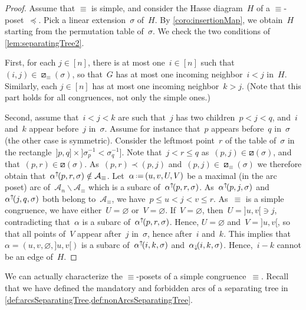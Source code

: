 \documentclass{amsart}
\theoremstyle{definition}
\newcommand{\ssm}{\smallsetminus} %
\newcommand{\eqdef}{\mbox{\,\raisebox{0.2ex}{\scriptsize\ensuremath{\mathrm:}}\ensuremath{=}\,}} %
\newcommand{\arcs}{{\mathcal{A}}} %
\newcommand{\arcDown}{\smash{\alpha_{\downarrow\!}}} %
\newcommand{\arcUp}{\smash{\alpha^{\uparrow\!}}} %
\begin{document}
\begin{proof}
Assume that $\equiv$ is simple, and consider the Hasse diagram~$H$ of a $\equiv$-poset~$\preccurlyeq$.
Pick a linear extension~$\sigma$ of~$H$.
By \cref{coro:insertionMap}, we obtain~$H$ starting from the permutation table of~$\sigma$.
We check the two conditions of \cref{lem:separatingTree2}.

First, for each $j \in [n]$, there is at most one~$i \in [n]$ such that~$(i,j) \in \boxslash_\equiv(\sigma)$, so that~$G$ has at most one incoming neighbor~$i < j$ in~$H$.
Similarly, each $j \in [n]$ has at most one incoming neighbor~$k > j$.
(Note that this part holds for all congruences, not only the simple ones.)

Second, assume that~$i < j < k$ are such that~$j$ has two children~$p < j < q$, and~$i$ and~$k$ appear before~$j$ in~$\sigma$.
Assume for instance that~$p$ appears before~$q$ in~$\sigma$ (the other case is symmetric).
Consider the leftmost point~$r$ of the table of~$\sigma$ in the rectangle~${]p, q]} \times {]\sigma^{-1}_p < \sigma^{-1}_q]}$.
Note that~${j < r \le q}$ as~$(p,j) \in \boxslash(\sigma)$, and that~$(p,r) \in \boxslash(\sigma)$.
As~$(p, r) \prec (p, j)$ and~$(p, j) \in \boxslash_\equiv(\sigma)$ we therefore obtain that~$\arcUp(p, r, \sigma) \notin \arcs_\equiv$.
Let~$\alpha \eqdef (u, v, U, V)$ be a maximal (in the arc poset) arc of~$\arcs_n \ssm \arcs_\equiv$ which is a subarc of~$\arcUp(p, r, \sigma)$.
As~$\arcUp(p, j, \sigma)$ and~$\arcUp(j, q, \sigma)$ both belong to~$\arcs_\equiv$, we have~$p \le u < j < v \le r$.
As~$\equiv$ is a simple congruence, we have either~$U = \varnothing$ or~$V = \varnothing$.
If~$V = \varnothing$, then~$U = {]u,v[} \ni j$, contradicting that~$\alpha$ is a subarc of~$\arcUp(p, r, \sigma)$.
Hence, $U = \varnothing$ and~$V = {]u,v[}$, so that all points of~$V$ appear after~$j$ in~$\sigma$, hence after~$i$ and~$k$.
This implies that~$\alpha = (u, v, \varnothing, {]u,v[})$ is a subarc of~$\arcUp(i, k, \sigma)$ and~$\arcDown(i, k, \sigma)$.
Hence,~$i-k$ cannot be an edge of~$H$.
\end{proof}

We can actually characterize the $\equiv$-posets of a simple congruence~$\equiv$.
Recall that we have defined the mandatory and forbidden arcs of a separating tree in \cref{def:arcsSeparatingTree,def:nonArcsSeparatingTree}.
\end{document}
